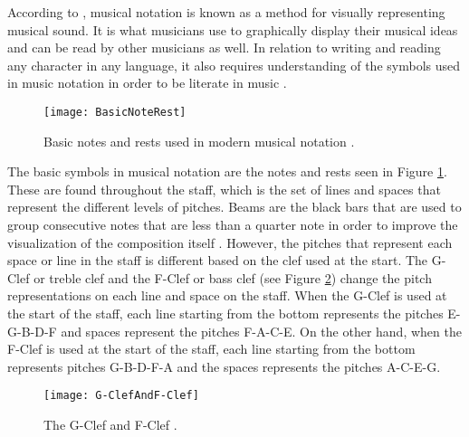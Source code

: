         According to \citet{read1969music}, musical notation is known as a method for visually representing musical sound. It is what musicians use to graphically display their musical ideas and can be read by other musicians as well. In relation to writing and reading any character in any language, it also requires understanding of the symbols used in music notation in order to be literate in music \citep{read1969music}. 
        
        
\begin{figure}[H]
	\centering
	\texttt{[image: BasicNoteRest]}
    \caption{Basic notes and rests used in modern musical notation \citep{riso2016basic}.}
    \label{fig:MUSIC_basic-notes-rests}
\end{figure}
        
        The basic symbols in musical notation are the notes and rests seen in Figure \ref{fig:MUSIC_basic-notes-rests}. These are found throughout the staff, which is the set of lines and spaces that represent the different levels of pitches. Beams are the black bars that are used to group consecutive notes that are less than a quarter note in order to improve the visualization of the composition itself \citep{spencer1996music}. However, the pitches that represent each space or line in the staff is different based on the clef used at the start. The G-Clef or treble clef and the F-Clef or bass clef (see Figure \ref{fig:MUSIC_gclef_fclef}) change the pitch representations on each line and space on the staff. When the G-Clef is used at the start of the staff, each line starting from the bottom represents the pitches E-G-B-D-F and spaces represent the pitches F-A-C-E. On the other hand, when the F-Clef is used at the start of the staff, each line starting from the bottom represents pitches G-B-D-F-A and the spaces represents the pitches A-C-E-G.
        
\begin{figure}[H]
	\centering
	\texttt{[image: G-ClefAndF-Clef]}
    \caption{The G-Clef and F-Clef \citep{stamp2013the}.} 
    \label{fig:MUSIC_gclef_fclef}
\end{figure}


